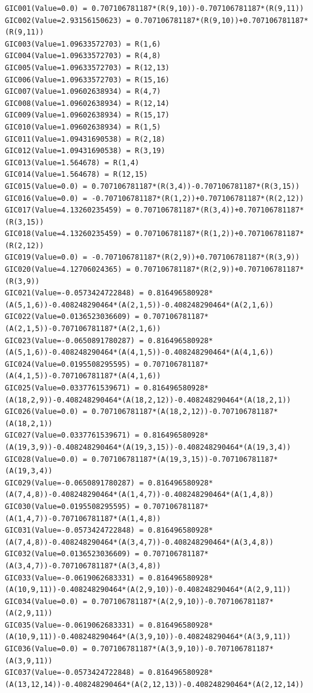 \documentclass[10pt]{article}
\begin{document}
\begin{lstlisting}[basicstyle=\ttfamily\scriptsize,caption={Complete norbornane Gaussian ReadAllGIC input.}]
GIC001(Value=0.0) = 0.707106781187*(R(9,10))-0.707106781187*(R(9,11))
GIC002(Value=2.93156150623) = 0.707106781187*(R(9,10))+0.707106781187*(R(9,11))
GIC003(Value=1.09633572703) = R(1,6)
GIC004(Value=1.09633572703) = R(4,8)
GIC005(Value=1.09633572703) = R(12,13)
GIC006(Value=1.09633572703) = R(15,16)
GIC007(Value=1.09602638934) = R(4,7)
GIC008(Value=1.09602638934) = R(12,14)
GIC009(Value=1.09602638934) = R(15,17)
GIC010(Value=1.09602638934) = R(1,5)
GIC011(Value=1.09431690538) = R(2,18)
GIC012(Value=1.09431690538) = R(3,19)
GIC013(Value=1.564678) = R(1,4)
GIC014(Value=1.564678) = R(12,15)
GIC015(Value=0.0) = 0.707106781187*(R(3,4))-0.707106781187*(R(3,15))
GIC016(Value=0.0) = -0.707106781187*(R(1,2))+0.707106781187*(R(2,12))
GIC017(Value=4.13260235459) = 0.707106781187*(R(3,4))+0.707106781187*(R(3,15))
GIC018(Value=4.13260235459) = 0.707106781187*(R(1,2))+0.707106781187*(R(2,12))
GIC019(Value=0.0) = -0.707106781187*(R(2,9))+0.707106781187*(R(3,9))
GIC020(Value=4.12706024365) = 0.707106781187*(R(2,9))+0.707106781187*(R(3,9))
GIC021(Value=-0.0573424722848) = 0.816496580928*(A(5,1,6))-0.408248290464*(A(2,1,5))-0.408248290464*(A(2,1,6))
GIC022(Value=0.0136523036609) = 0.707106781187*(A(2,1,5))-0.707106781187*(A(2,1,6))
GIC023(Value=-0.0650891780287) = 0.816496580928*(A(5,1,6))-0.408248290464*(A(4,1,5))-0.408248290464*(A(4,1,6))
GIC024(Value=0.0195508295595) = 0.707106781187*(A(4,1,5))-0.707106781187*(A(4,1,6))
GIC025(Value=0.0337761539671) = 0.816496580928*(A(18,2,9))-0.408248290464*(A(18,2,12))-0.408248290464*(A(18,2,1))
GIC026(Value=0.0) = 0.707106781187*(A(18,2,12))-0.707106781187*(A(18,2,1))
GIC027(Value=0.0337761539671) = 0.816496580928*(A(19,3,9))-0.408248290464*(A(19,3,15))-0.408248290464*(A(19,3,4))
GIC028(Value=0.0) = 0.707106781187*(A(19,3,15))-0.707106781187*(A(19,3,4))
GIC029(Value=-0.0650891780287) = 0.816496580928*(A(7,4,8))-0.408248290464*(A(1,4,7))-0.408248290464*(A(1,4,8))
GIC030(Value=0.0195508295595) = 0.707106781187*(A(1,4,7))-0.707106781187*(A(1,4,8))
GIC031(Value=-0.0573424722848) = 0.816496580928*(A(7,4,8))-0.408248290464*(A(3,4,7))-0.408248290464*(A(3,4,8))
GIC032(Value=0.0136523036609) = 0.707106781187*(A(3,4,7))-0.707106781187*(A(3,4,8))
GIC033(Value=-0.0619062683331) = 0.816496580928*(A(10,9,11))-0.408248290464*(A(2,9,10))-0.408248290464*(A(2,9,11))
GIC034(Value=0.0) = 0.707106781187*(A(2,9,10))-0.707106781187*(A(2,9,11))
GIC035(Value=-0.0619062683331) = 0.816496580928*(A(10,9,11))-0.408248290464*(A(3,9,10))-0.408248290464*(A(3,9,11))
GIC036(Value=0.0) = 0.707106781187*(A(3,9,10))-0.707106781187*(A(3,9,11))
GIC037(Value=-0.0573424722848) = 0.816496580928*(A(13,12,14))-0.408248290464*(A(2,12,13))-0.408248290464*(A(2,12,14))

\end{lstlisting}
\end{document}
